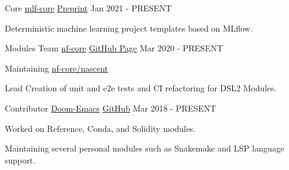 

\begin{cventries}


	\cventry
	{Core} %
	{\href{https://www.mlf-core.com/index}{mlf-core}} %
	{\href{https://arxiv.org/abs/2104.07651}{Preprint}}
	{Jan 2021 - PRESENT} %
	{
		\begin{cvitems} %
			\item {Deterministic machine learning project templates based on MLflow.}
		\end{cvitems}
	}

	\cventry
	{Modules Team} %
	{\href{https://nf-co.re/}{nf-core}} %
	{\href{https://github.com/nf-core}{GitHub Page}} %
	{Mar 2020 - PRESENT} %
	{
		\begin{cvitems} %
			\item {Maintaining \href{https://nf-co.re/nascent}{nf-core/nascent}}
			\item {Lead Creation of unit and e2e tests and CI refactoring for DSL2 Modules.}
		\end{cvitems}
	}


	\cventry
	{Contributor} %
	{\href{https://github.com/hlissner/doom-emacs}{Doom-Emacs}} %
	{\href{https://github.com/hlissner/doom-emacs}{GitHub}} %
	{Mar 2018 - PRESENT} %
	{
		\begin{cvitems} %
			\item {Worked on Reference, Conda, and Solidity modules.}
			\item {Maintaining several personal modules such as Snakemake and LSP language support.}
		\end{cvitems}
	}


\end{cventries}

